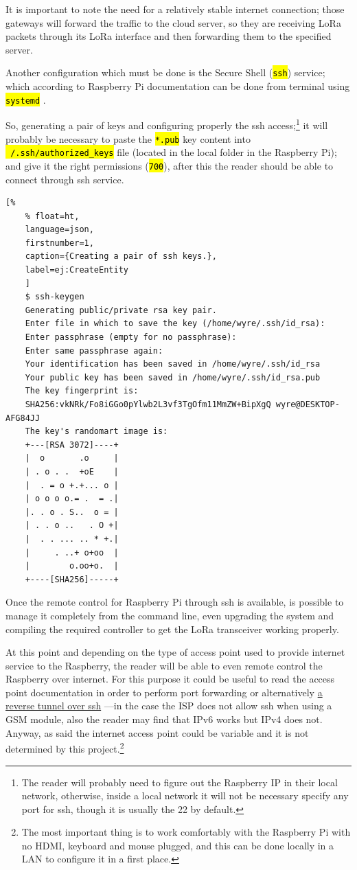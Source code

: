 \documentclass[11pt,a4paper,dvipsnames,twoside]{article}
\newcommand{\cmd}[1] {\hl{\texttt{#1}}}
\begin{document}
It is important to note the need for a relatively stable internet connection; those gateways will forward the traffic to the cloud server, so they are receiving LoRa packets through its LoRa interface and then forwarding them to the specified server. 

Another configuration which must be done is the Secure Shell (\cmd{ssh}) service; which according to Raspberry Pi documentation can be done from terminal using \cmd{systemd} \cite{RaspiSSH}. 

So, generating a pair of keys and configuring properly the ssh access;\footnote{The reader will probably need to figure out the Raspberry IP in their local network, otherwise, inside a local network it will not be necessary specify any port for ssh, though it is usually the 22 by default.} it will probably be necessary to paste the \cmd{*.pub} key content into \cmd{~/.ssh/authorized\_keys} file (located in the local folder in the Raspberry Pi); and give it the right permissions (\cmd{700}), after this the reader should be able to connect through ssh service.

\begin{lstlisting}[%
    % float=ht,
    language=json,
    firstnumber=1,
    caption={Creating a pair of ssh keys.},
    label=ej:CreateEntity
    ]
    $ ssh-keygen
    Generating public/private rsa key pair.
    Enter file in which to save the key (/home/wyre/.ssh/id_rsa): 
    Enter passphrase (empty for no passphrase): 
    Enter same passphrase again: 
    Your identification has been saved in /home/wyre/.ssh/id_rsa
    Your public key has been saved in /home/wyre/.ssh/id_rsa.pub
    The key fingerprint is:
    SHA256:vkNRk/Fo8iGGo0pYlwb2L3vf3TgOfm11MmZW+BipXgQ wyre@DESKTOP-AFG84JJ
    The key's randomart image is:
    +---[RSA 3072]----+
    |  o       .o     |
    | . o . .  +oE    |
    |  . = o +.+... o |
    | o o o o.= .  = .|
    |. . o . S..  o = |
    | . . o ..   . O +|
    |  . . ... .. * +.|
    |     . ..+ o+oo  |
    |        o.oo+o.  |
    +----[SHA256]-----+
\end{lstlisting}

Once the remote control for Raspberry Pi through ssh is available, is possible to manage it completely from the command line, even upgrading the system and compiling the required controller to get the LoRa transceiver working properly.

At this point and depending on the type of access point used to provide internet service to the Raspberry, the reader will be able to even remote control the Raspberry over internet. For this purpose it could be useful to read the access point documentation in order to perform port forwarding or alternatively \href{http://www.thirdway.ch/En/projects/raspberry_pi_3g/index.php}{a reverse tunnel over ssh} ---in the case the ISP does not allow ssh when using a GSM module, also the reader may find that IPv6 works but IPv4 does not. Anyway, as said the internet access point could be variable and it is not determined by this project.\footnote{The most important thing is to work comfortably with the Raspberry Pi with no HDMI, keyboard and mouse plugged, and this can be done locally in a LAN to configure it in a first place.}  
\end{document}

